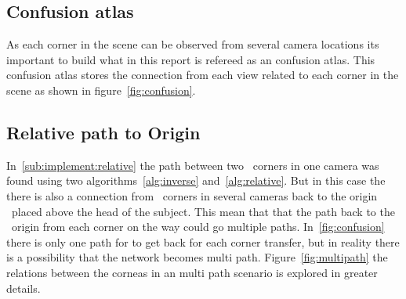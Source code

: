 \subsection{Confusion atlas}\label{sub:implement:confusion}
As each \aruco corner in the scene can be observed from several camera locations its important to build what in this report is refereed as an confusion atlas.
This confusion atlas stores the connection from each view related to each corner in the scene as shown in figure~\ref{fig:confusion}.




\subsection{Relative path to Origin}\label{sub:implement:relativepath}
In~\ref{sub:implement:relative} the path between two \aruco\ corners in one camera was found using two algorithms~\ref{alg:inverse} and~\ref{alg:relative}.
But in this case the there is also a connection from \aruco\ corners in several cameras back to the origin \aruco\ placed above the head of the subject.
This mean that that the path back to the \aruco\ origin from each corner on the way could go multiple paths.
In~\ref{fig:confusion} there is only one path for to get back for each corner transfer, but in reality there is a possibility that the network becomes multi path.
Figure~\ref{fig:multipath} the relations between the corneas in an multi path scenario is explored in greater details.


